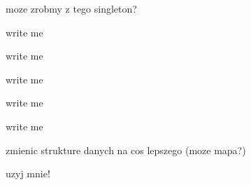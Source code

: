
\begin{DoxyRefList}
\item[\label{todo__todo000001}%
\hypertarget{todo__todo000001}{}%
Klasa \hyperlink{structcommon_1_1Config}{common\-:\-:Config} ]moze zrobmy z tego singleton?  
\item[\label{todo__todo000002}%
\hypertarget{todo__todo000002}{}%
Składowa \hyperlink{classcommon_1_1Creature_a1aef36038cf8c079ea534175ce34966c}{common\-:\-:Creature\-:\-:Creature} (const Creature \&mother, const Creature \&father)]write me  
\item[\label{todo__todo000003}%
\hypertarget{todo__todo000003}{}%
Składowa \hyperlink{classcommon_1_1Creature_ac92d5a9bd6bbcc2a78e37278ed335a18}{common\-:\-:Creature\-:\-:Creature} (double x\-\_\-pos, double y\-\_\-pos)]write me  
\item[\label{todo__todo000004}%
\hypertarget{todo__todo000004}{}%
Składowa \hyperlink{classcommon_1_1Creature_a604e9f9a6765a8c90eb250be48813ac5}{common\-:\-:Creature\-:\-:is\-Dead} () const ]write me  
\item[\label{todo__todo000005}%
\hypertarget{todo__todo000005}{}%
Klasa \hyperlink{classcommon_1_1Herbivore}{common\-:\-:Herbivore} ]write me  
\item[\label{todo__todo000006}%
\hypertarget{todo__todo000006}{}%
Klasa \hyperlink{classcommon_1_1Map}{common\-:\-:Map} ]write me  
\item[\label{todo__todo000007}%
\hypertarget{todo__todo000007}{}%
Składowa \hyperlink{classcommon_1_1Map_a810206d6817e73a9f60344c42ce40178}{common\-:\-:Map\-:\-:objects} ]zmienic strukture danych na cos lepszego (moze mapa?)  
\item[\label{todo__todo000008}%
\hypertarget{todo__todo000008}{}%
Składowa \hyperlink{classcommon_1_1Map_adea5eca91ec93db01ec5920bb26a3fd3}{common\-:\-:Map\-:\-:serialize} (Archive \&ar, const unsigned int version)]uzyj mnie! 
\end{DoxyRefList}